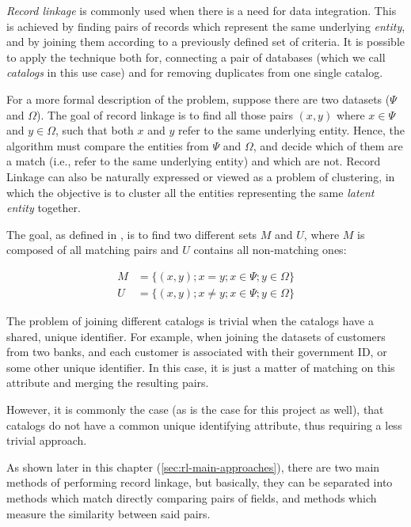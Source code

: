 \documentclass[epsfig,a4paper,11pt,titlepage,twoside,openany]{book}
\begin{document}
\textit{Record linkage} is commonly used when there is a need for data integration. This is achieved by finding pairs of records which represent the same underlying \textit{entity}, and by joining them according to a previously defined set of criteria. It is possible to apply the technique both for, connecting a pair of databases (which we call \textit{catalogs} in this use case) and for removing duplicates from one single catalog.

  

For a more formal description of the problem, suppose there are two datasets ($\Psi$ and $\Omega$). The goal of record linkage is to find all those pairs $(x, y)$ where $x \in \Psi$ and $y \in \Omega$, such that both $x$ and $y$ refer to the same underlying entity. Hence, the algorithm must compare the entities from $\Psi$ and $\Omega$, and decide which of them are a match (i.e., refer to the same underlying entity) and which are not. 
Record Linkage can also be naturally expressed or viewed as a problem of clustering, in which the objective is to cluster all the entities representing the same \textit{latent entity} together.

The goal, as defined in \cite{fellegi69_theor_recor_linkag}, is to find two different sets $M$ and $U$, where $M$ is composed of all matching pairs and $U$ contains all non-matching ones:

\begin{align*}
  M &= \{(x, y); x = y; x \in \Psi; y \in \Omega\} \\
  U &= \{(x, y); x \neq y; x \in \Psi; y \in \Omega\}
\end{align*}

The problem of joining different catalogs is trivial when the catalogs have a
shared, unique identifier. For example, when joining the datasets of
customers from two banks, and each customer is associated with their government
ID, or some other unique identifier. In this case, it is just a matter of
matching on this attribute and merging the resulting pairs.

However, it is commonly the case (as is the case for this project as well), that
catalogs do not have a common unique identifying attribute, thus requiring a less trivial approach.

As shown later in this chapter (\autoref{sec:rl-main-approaches}), there are two main methods of performing record linkage, but basically, they can be separated into methods which match directly comparing pairs of fields, and methods which measure the similarity between said pairs.
\end{document}
